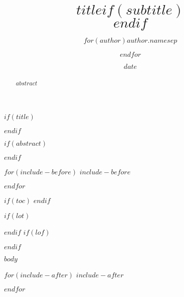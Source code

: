 \documentclass[
$if(fontsize)$$fontsize$,$endif$
french,                           %
$if(papersize)$$papersize$,$endif$
$for(classoption)$$classoption$$sep$,$endfor$]{$documentclass$}
\title{$title$$if(subtitle)$\\\vspace{0.5em}{\large $subtitle$}$endif$}
\author{$for(author)$$author.name$$sep$ \and $endfor$}
\date{$date$}
\begin{document}
$if(title)$
\maketitle
$endif$

\clearpage

$if(abstract)$
\begin{abstract}
$abstract$
\end{abstract}
$endif$

$for(include-before)$
$include-before$

$endfor$

$if(toc)$
{
  \hypersetup{linkcolor=$if(toccolor)$$toccolor$$else$black$endif$}
  \setcounter{tocdepth}{$toc-depth$}
  \tableofcontents
}
$endif$

$if(lot)$
\listoftables
$endif$
$if(lof)$
\listoffigures
$endif$

\clearpage
$body$

$for(include-after)$
$include-after$

$endfor$
\end{document}
